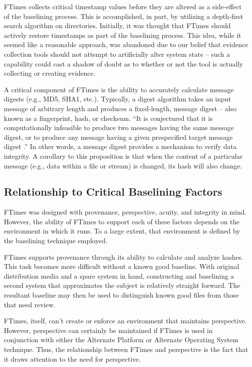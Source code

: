 \documentclass[10pt]{article}
\begin{document}
FTimes collects critical timestamp values before they are altered as a
side-effect of the baselining process.  This is accomplished, in part,
by utilizing a depth-first search algorithm on directories.
Initially, it was thought that FTimes should actively restore
timestamps as part of the baselining process.  This idea, while it
seemed like a reasonable approach, was abandoned due to our belief
that evidence collection tools should not attempt to artificially
alter system state -- such a capability could cast a shadow of doubt
as to whether or not the tool is actually collecting or creating
evidence.

A critical component of FTimes is the ability to accurately calculate
message digests (e.g., MD5, SHA1, etc.).  Typically, a digest
algorithm takes an input message of arbitrary length and produces a
fixed-length, message digest -- also known as a fingerprint, hash, or
checksum.  ``It is conjectured that it is computationally infeasible
to produce two messages having the same message digest, or to produce
any message having a given prespecified target message digest
\cite{md5}.''  In other words, a message digest provides a mechanism
to verify data integrity.  A corollary to this proposition is that
when the content of a particular message (e.g., data within a file or
stream) is changed, its hash will also change.

\subsection{Relationship to Critical Baselining Factors}

FTimes was designed with provenance, perspective, acuity, and
integrity in mind.  However, the ability of FTimes to support each of
these factors depends on the environment in which it runs.  To a large
extent, that environment is defined by the baselining technique
employed.

FTimes supports provenance through its ability to calculate and
analyze hashes.  This task becomes more difficult without a known good
baseline.  With original distribution media and a spare system in
hand, constructing and baselining a second system that approximates
the subject is relatively straight forward.  The resultant baseline
may then be used to distinguish known good files from those that need
review.

FTimes, itself, can't create or enforce an environment that maintains
perspective.  However, perspective can certainly be maintained if
FTimes is used in conjunction with either the Alternate Platform or
Alternate Operating System technique.  Thus, the relationship between
FTimes and perspective is the fact that it draws attention to the need
for perspective.
\end{document}
